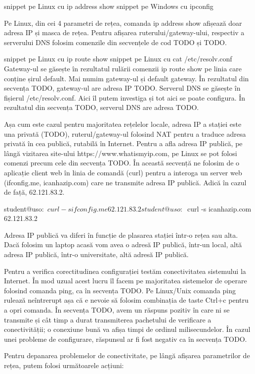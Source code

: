 snippet pe Linux cu ip address show
snippet pe Windows cu ipconfig

Pe Linux, din cei 4 parametri  de rețea, comanda ip address show afișează doar adresa IP și masca de rețea. Pentru afișarea ruterului/gateway-ului, respectiv a serverului DNS folosim comenzile din secvențele de cod TODO și TODO.

snippet pe Linux cu ip route show
snippet pe Linux cu cat /etc/resolv.conf
Gateway-ul se găsește în rezultatul rulării comenzii ip route show pe linia care conține șirul default. Mai numim gateway-ul și default gateway. În rezultatul din secvența TODO, gateway-ul are adresa IP TODO.
Serverul DNS se găsește în fișierul /etc/resolv.conf. Aici îl putem investiga și tot aici se poate configura. În rezultatul din secvența TODO, serverul DNS are adresa TODO.

Așa cum este cazul pentru majoritatea rețelelor locale, adresa IP a stației este una privată (TODO), ruterul/gateway-ul folosind NAT pentru a traduce adresa privată în cea publică, rutabilă în Internet. Pentru a afla adresa IP publică, pe lângă vizitarea site-ului https://www.whatismyip.com, pe Linux se pot folosi comenzi precum cele din secvența TODO. În această secvență ne folosim de o aplicație client web în linia de comandă (curl) pentru a interoga un server web (ifconfig.me, icanhazip.com) care ne transmite adresa IP publică. Adică în cazul de față, 62.121.83.2.

student@uso:~$ curl -s ifconfig.me
62.121.83.2
student@uso:~$ curl -s icanhazip.com
62.121.83.2

Adresa IP publică va diferi în funcție de plasarea stației într-o rețea sau alta. Dacă folosim un laptop acasă vom avea o adresă IP publică, într-un local, altă adresa IP publică, într-o universitate, altă adresă IP publică.

Pentru a verifica corectitudinea configurației testăm conectivitatea sistemului la Internet. În mod uzual acest lucru îl facem pe majoritatea sistemelor de operare folosind comanda ping, ca în secvența TODO. Pe Linux/Unix comanda ping rulează neîntrerupt așa că e nevoie să folosim combinația de taste Ctrl+c pentru a opri comanda. În secvența TODO, avem un răspuns pozitiv în care ni se transmite și cât timp a durat transmiterea pachetului de verificare a conectivității; o conexiune bună va afișa timpi de ordinul milisecundelor. În cazul unei probleme de configurare, răspunsul ar fi fost negativ ca în secvența TODO.

Pentru depanarea problemelor de conectivitate, pe lângă afișarea parametrilor de rețea, putem folosi următoarele acțiuni:

